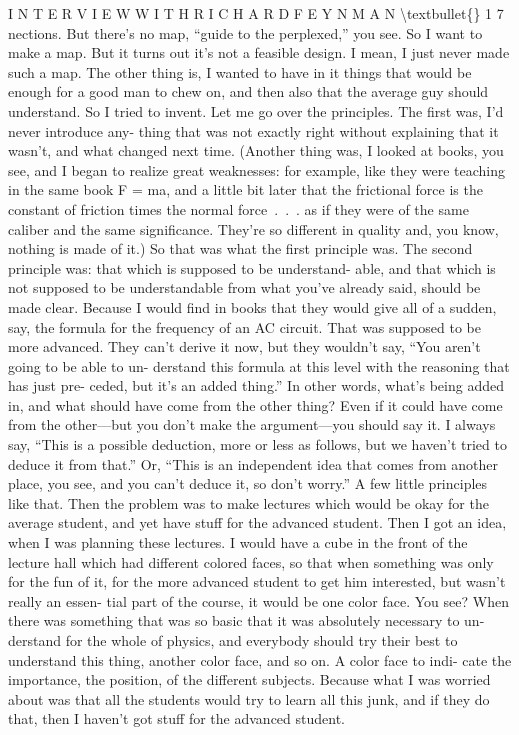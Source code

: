 \documentclass[10pt,oneside]{article}
\begin{document}
I N T E R V I E W  W I T H  R I C H A R D  F E Y N M A N \textbackslash{}textbullet\{\} 1 7 nections. But there’s no map, “guide to the perplexed,” you see. So I want to make a map. But it turns out it’s not a feasible design. I mean, I just never made such a map. The other thing is, I wanted to have in it things that would be enough for a good man to chew on, and then also that the average guy should understand. So I tried to invent. Let me go over the principles. The first was, I’d never introduce any- thing that was not exactly right without explaining that it wasn’t, and what changed next time. (Another thing was, I looked at books, you see, and I began to realize great weaknesses: for example, like they were teaching in the same book F = ma, and a little bit later that the frictional force is the constant of friction times the normal force . . . as if they were of the same caliber and the same significance. They’re so different in quality and, you know, nothing is made of it.) So that was what the first principle was. The second principle was: that which is supposed to be understand- able, and that which is not supposed to be understandable from what you’ve already said, should be made clear. Because I would find in books that they would give all of a sudden, say, the formula for the frequency of an AC circuit. That was supposed to be more advanced. They can’t derive it now, but they wouldn’t say, “You aren’t going to be able to un- derstand this formula at this level with the reasoning that has just pre- ceded, but it’s an added thing.” In other words, what’s being added in, and what should have come from the other thing? Even if it could have come from the other---but you don’t make the argument---you should say it. I always say, “This is a possible deduction, more or less as follows, but we haven’t tried to deduce it from that.” Or, “This is an independent idea that comes from another place, you see, and you can’t deduce it, so don’t worry.” A few little principles like that. Then the problem was to make lectures which would be okay for the average student, and yet have stuff for the advanced student. Then I got an idea, when I was planning these lectures. I would have a cube in the front of the lecture hall which had different colored faces, so that when something was only for the fun of it, for the more advanced student to get him interested, but wasn’t really an essen- tial part of the course, it would be one color face. You see? When there was something that was so basic that it was absolutely necessary to un- derstand for the whole of physics, and everybody should try their best to understand this thing, another color face, and so on. A color face to indi- cate the importance, the position, of the different subjects. Because what I was worried about was that all the students would try to learn all this junk, and if they do that, then I haven’t got stuff for the advanced student.\par
\end{document}
